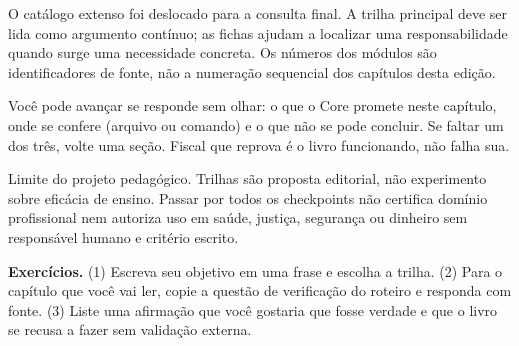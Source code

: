 O catálogo extenso foi deslocado para a consulta final. A trilha principal deve
ser lida como argumento contínuo; as fichas ajudam a localizar uma responsabilidade
quando surge uma necessidade concreta. Os números dos módulos são identificadores
de fonte, não a numeração sequencial dos capítulos desta edição.

\begin{checkpoint}
Você pode avançar se responde sem olhar: o que o Core promete neste capítulo, onde se confere (arquivo ou comando) e o que não se pode concluir. Se faltar um dos três, volte uma seção. Fiscal que reprova é o livro funcionando, não falha sua.
\end{checkpoint}

\begin{aviso}
Limite do projeto pedagógico. Trilhas são proposta editorial, não experimento sobre eficácia de ensino. Passar por todos os checkpoints não certifica domínio profissional nem autoriza uso em saúde, justiça, segurança ou dinheiro sem responsável humano e critério escrito.
\end{aviso}

\begin{resultado}
\textbf{Exercícios.} (1) Escreva seu objetivo em uma frase e escolha a trilha. (2) Para o capítulo que você vai ler, copie a questão de verificação do roteiro e responda com fonte. (3) Liste uma afirmação que você gostaria que fosse verdade e que o livro se recusa a fazer sem validação externa.
\end{resultado}

